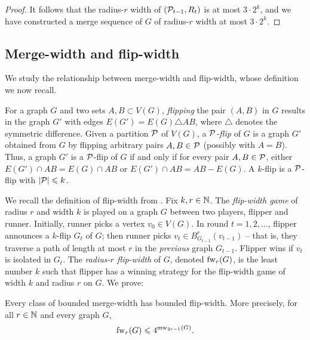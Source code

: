 \begin{proof}
It follows that the radius-$r$ width of $(\cal P_{t-1},R_t)$ is at most $3\cdot 2^k$, and we have constructed a merge sequence of $G$ 
of radius-$r$ width at most $3\cdot 2^k$.
\end{proof}























 






\subsection{Merge-width and flip-width}\label{sec:fw}
We study the relationship between merge-width and flip-width, whose definition we now recall.

For a graph $G$ and 
two sets $A,B\subset V(G)$,
\emph{flipping} the pair $(A,B)$ in $G$ 
results in the graph $G'$ 
with edges $E(G')=E(G)\triangle AB$, where \(\triangle\) denotes the symmetric difference.
Given a partition $\cal P$ of $V(G)$, 
a \emph{$\cal P$-flip} of $G$ is a graph $G'$
obtained from $G$ by flipping arbitrary pairs $A,B\in\cal P$ (possibly with $A=B$).
Thus, a graph $G'$ is a $\cal P$-flip of $G$ if and only if for every pair $A,B\in\cal P$, 
either $E(G')\cap AB=E(G)\cap AB$ or $E(G')\cap AB=AB-E(G)$.
A \(k\)-flip is a \(\cal P\)-flip with \(|\cal P| \le k\).

We recall the definition of flip-width from \cite{flip-width}.
Fix $k,r\in\N$.
The \emph{flip-width game} of radius $r$ and width $k$ is played on a graph $G$ between two players, flipper and runner.
Initially, runner picks a vertex $v_0\in V(G)$.
In round $t=1,2,\ldots$,
    flipper announces a $k$-flip $G_t$ of $G$;
    then runner picks $v_t\in B^r_{G_{t-1}}(v_{t-1})$ -- that is, they traverse 
    a path of length at most $r$ in the \emph{previous} graph $G_{t-1}$.
    Flipper wins if $v_t$ is isolated in $G_t$.
The \emph{radius-$r$ flip-width} of $G$, denoted $\fw_r(G)$,
is the least number $k$ such that flipper has a winning strategy for the flip-width game of width $k$ and radius $r$ on $G$.
We prove:
\begin{theorem}\label{thm:fw-cases}
  Every class of bounded merge-width has bounded flip-width.
  More precisely, for all $r\in\N$ and every graph $G$,
  $$\fw_r(G)\le 4^{\mw_{2r-1}(G)}.$$
\end{theorem}

